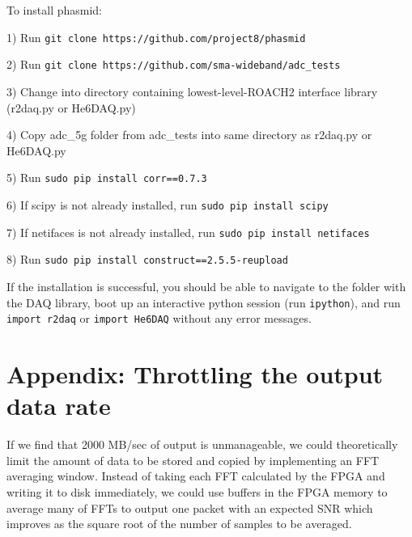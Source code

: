 \documentclass[a4paper,10pt]{article}
\begin{document}
To install phasmid:
\vspace{3mm}

1) Run \texttt{git clone https://github.com/project8/phasmid} 
\vspace{3mm}

2) Run \texttt{git clone https://github.com/sma-wideband/adc\_tests}
\vspace{3mm}

\hangindent=0.5cm
3) Change into directory containing lowest-level-ROACH2 interface library (r2daq.py or He6DAQ.py)
\vspace{3mm}

\hangindent=0.5cm
4) Copy adc\_5g folder from adc\_tests into same directory as r2daq.py or He6DAQ.py
\vspace{3mm}

5) Run \texttt{sudo pip install corr==0.7.3}
\vspace{3mm}

6) If scipy is not already installed, run \texttt{sudo pip install scipy}
\vspace{3mm}

7) If netifaces is not already installed, run \texttt{sudo pip install netifaces}
\vspace{3mm}

8) Run \texttt{sudo pip install construct==2.5.5-reupload}
\vspace{3mm}

If the installation is successful, you should be able to navigate to the folder with the DAQ library, boot up an interactive python session (run \texttt{ipython}), and run \texttt{import r2daq} or \texttt{import He6DAQ} without any error messages.

\section{Appendix: Throttling the output data rate}
If we find that 2000 MB/sec of output is unmanageable, we could theoretically limit the amount of data to be stored and copied by implementing an FFT averaging window. Instead of taking each FFT calculated by the FPGA and writing it to disk immediately, we could use buffers in the FPGA memory to average many of FFTs to output one packet with an expected SNR which improves as the square root of the number of samples to be averaged. 
\end{document}
